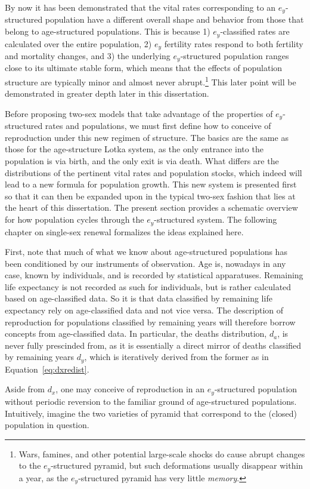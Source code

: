  \FloatBarrier
\label{sec:exstructuredrenewal}
By now it has been demonstrated that the vital rates corresponding to an
$e_y$-structured population have a different overall shape and behavior from
those that belong to age-structured populations. This is because 1) $e_y$-classified rates
are calculated over the entire population, 2) $e_y$ fertility rates respond to
both fertility and mortality changes, and 3) the underlying $e_y$-structured
population ranges close to its ultimate stable form, which means that
the effects of population structure are typically minor and almost never
abrupt.\footnote{Wars, famines, and other potential large-scale shocks do cause
abrupt changes to the $e_y$-structured pyramid, but such deformations usually
disappear within a year, as the  $e_y$-structured pyramid has very little
\textit{memory}.} This later point will be demonstrated in greater depth later
in this dissertation.

Before proposing two-sex models that take advantage of the properties of
$e_y$-structured rates and populations, we must first define how to conceive of
reproduction under this new regimen of structure. The basics are the
same as those for the age-structure Lotka system, as the only entrance into the
population is via birth, and the only exit is via death. What differs are the
distributions of the pertinent vital rates and population stocks, which indeed
will lead to a new formula for population growth. This new system is 
presented first so that it can then be expanded upon in the typical two-sex
fashion that lies at the heart of this dissertation. The present section
provides a schematic overview for how population cycles through the
$e_y$-structured system. The following chapter on single-sex renewal formalizes
the ideas explained here.

First, note that much of what we know about age-structured populations has been
conditioned by our instruments of observation. Age is, nowadays in any case,
known by individuals, and is recorded by statistical apparatuses. Remaining life
expectancy is not recorded as such for individuals, but is rather calculated
based on age-classified data. So it is that data classified by remaining
life expectancy rely on age-classified data and not vice versa. The description of 
reproduction for populations classified by remaining years will therefore
 borrow concepts from age-classified data. In particular, the deaths
distribution, $d_a$, is never fully prescinded from, as it is essentially a
direct mirror of deaths classified by remaining years $d_y$, which is
iteratively derived from the former as in Equation~\eqref{eq:dxredist}.

Aside from $d_x$, one may conceive of reproduction in an $e_y$-structured
population without periodic reversion to the familiar ground of age-structured
populations. Intuitively, imagine the two varieties of pyramid that correspond to the
(closed) population in question. 